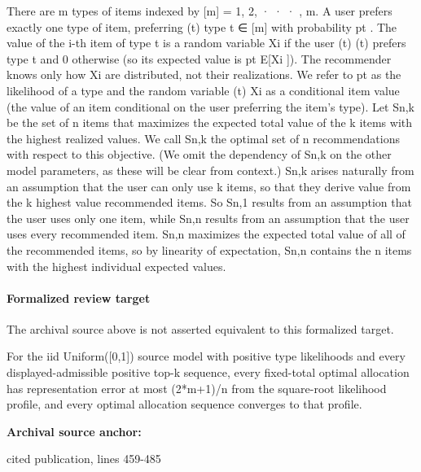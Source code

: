 \documentclass[10pt]{article}
\begin{document}
\begin{ReviewVerbatim}
There are m types of items indexed by [m] = {1, 2, · · · , m}. A user prefers exactly one type of item, preferring
(t)
type t ∈ [m] with probability pt . The value of the i-th item of type t is a random variable Xi if the user
(t)
(t)
prefers type t and 0 otherwise (so its expected value is pt E[Xi ]). The recommender knows only how Xi
are distributed, not their realizations. We refer to pt as the likelihood of a type and the random variable
(t)
Xi as a conditional item value (the value of an item conditional on the user preferring the item’s type).
Let Sn,k be the set of n items that maximizes the expected total value of the k items with the highest
realized values. We call Sn,k the optimal set of n recommendations with respect to this objective. (We omit
the dependency of Sn,k on the other model parameters, as these will be clear from context.)
Sn,k arises naturally from an assumption that the user can only use k items, so that they derive value
from the k highest value recommended items. So Sn,1 results from an assumption that the user uses only
one item, while Sn,n results from an assumption that the user uses every recommended item.
Sn,n maximizes the expected total value of all of the recommended items, so by linearity of expectation,
Sn,n contains the n items with the highest individual expected values.
\end{ReviewVerbatim}


\paragraph{Formalized review target}
The archival source above is not asserted equivalent to this formalized target.
\begin{ReviewVerbatim}
For the iid Uniform([0,1]) source model with positive type likelihoods and every displayed-admissible positive top-k sequence, every fixed-total optimal allocation has representation error at most (2*m+1)/n from the square-root likelihood profile, and every optimal allocation sequence converges to that profile.
\end{ReviewVerbatim}

\textbf{Archival source anchor:} {\footnotesize\raggedright cited publication, lines 459-\allowbreak{}485\par}
\end{document}
